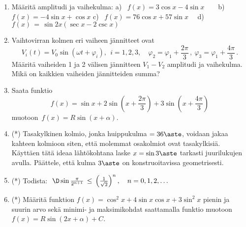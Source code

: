 \begin{enumerate}
\item
Määritä amplitudi ja vaihekulma: \newline
a) \ $f(x)=3\cos x-4\sin x \quad\ \ \ $ b) \ $f(x)=-4\sin x+\cos x$ \newline
c) \ $f(x)=76\cos x+57\sin x \quad$     d) \ $f(x)\,=\,\sin 2x(\sec x-2\csc x)$

\item
Vaihtovirran kolmen eri vaiheen jännitteet ovat
\[
V_i(t)=V_0\sin(\omega t+\varphi_i),\ \ i=1,2,3, \quad \varphi_2=\varphi_1 + \frac{2\pi}{3}\,,\
                                                      \varphi_3=\varphi_1 + \frac{4\pi}{3}\,.
\]
Määritä vaiheiden 1 ja 2 välisen jännitteen $V_1-V_2$ amplitudi ja vaihekulma. Mikä on 
kaikkien vaiheiden jännitteiden summa?

\item
Saata funktio
\[
f(x) = \sin x + 2\sin(x+\frac{2\pi}{3})+3\sin(x+\frac{4\pi}{3})
\]
muotoon $\,f(x)=R\sin(x+\alpha)$.

\item (*) \label{H-II-6: geometrinen kulma}
Tasakylkinen kolmio, jonka huippukulma $=36\aste$, voidaan jakaa kahteen kolmioon siten, että
molemmat osakolmiot ovat tasakylkisiä. Käyttäen tätä ideaa lähtökohtana laske $x=\sin 3\aste$
tarkasti juurilukujen avulla. Päättele, että kulma $3\aste$ on konstruoitavissa geometrisesti.

\item (*) \label{H-II-6: sinin raja-arvo}
Todista: $\ {\D \sin\frac{\pi}{2^{n+1}} 
               \,\le\, \left(\frac{1}{\sqrt{2}}\right)^n, \quad n=0,1,2, \ldots}$ 

\item (*) \label{H-II-6: minmax}
Määritä funktion $f(x)=\cos^2 x+4\sin x\cos x+3\sin^2 x$ pienin ja suurin arvo sekä minimi-
ja maksimikohdat saattamalla funktio muotoon $f(x)=R\sin(2x+\alpha)+C$.

\end{enumerate}